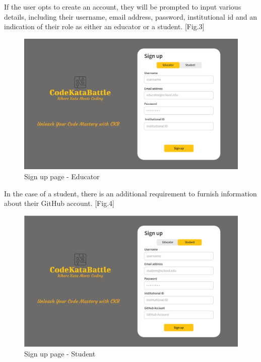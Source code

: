\documentclass[12pt,oneside,a4paper]{article}
\begin{document}
\clearpage

\begin{flushleft}
If the user opts to create an account, they will be prompted to input various details, including their username, email address, password, institutional id and an indication of their role as either an educator or a student. [Fig.3]    
\end{flushleft} 
\begin{figure}[htbp]
    \centering
    \includegraphics[width=1\linewidth]{Images/Interfaces/Educator Interfaces/EducatorSignUp.png}
    \caption{Sign up page - Educator}
    \label{fig:enter-label}
\end{figure}

\pagebreak

\begin{flushleft}
In the case of a student, there is an additional requirement to furnish information about their GitHub account. [Fig.4] 
\end{flushleft}
\begin{figure}[htbp]
    \centering
    \includegraphics[width=1\linewidth]{Images/Interfaces/Student Interfaces/StudentSignUp.png}
    \caption{Sign up page - Student}
    \label{fig:enter-label}
\end{figure}
\end{document}
